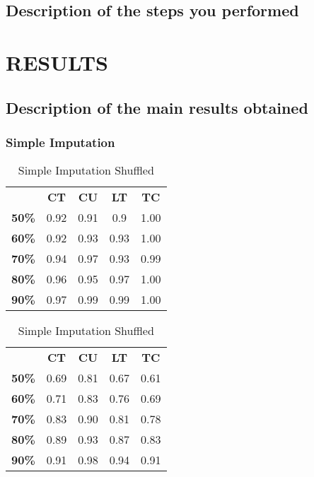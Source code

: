 \documentclass{article}
\begin{document}
\subsection{Description of the steps you performed}
\newpage
\section{RESULTS}
\subsection{Description of the main results obtained}

\subsubsection{Simple Imputation}

\begin{table}[h]
\begin{minipage}{.45\textwidth}\centering
\begin{tabular}{ccccc}
              & \textbf{CT} & \textbf{CU} & \textbf{LT} & \textbf{TC} \\
\textbf{50\%} & 0.92        & 0.91        & 0.9         & 1.00        \\
\textbf{60\%} & 0.92        & 0.93        & 0.93        & 1.00        \\
\textbf{70\%} & 0.94        & 0.97        & 0.93        & 0.99        \\
\textbf{80\%} & 0.96        & 0.95        & 0.97        & 1.00        \\
\textbf{90\%} & 0.97        & 0.99        & 0.99        & 1.00       
\end{tabular}
\caption{Simple Imputation}
\end{minipage}
\hfill
\begin{minipage}{.45\textwidth}\centering
\begin{tabular}{ccccc}
              & \textbf{CT} & \textbf{CU} & \textbf{LT} & \textbf{TC} \\
\textbf{50\%} & 0.69        & 0.81        & 0.67        & 0.61        \\
\textbf{60\%} & 0.71        & 0.83        & 0.76        & 0.69        \\
\textbf{70\%} & 0.83        & 0.90        & 0.81        & 0.78        \\
\textbf{80\%} & 0.89        & 0.93        & 0.87        & 0.83        \\
\textbf{90\%} & 0.91        & 0.98        & 0.94        & 0.91       
\end{tabular}
\caption{Simple Imputation Shuffled}
\end{minipage}
\end{table}
\end{document}
